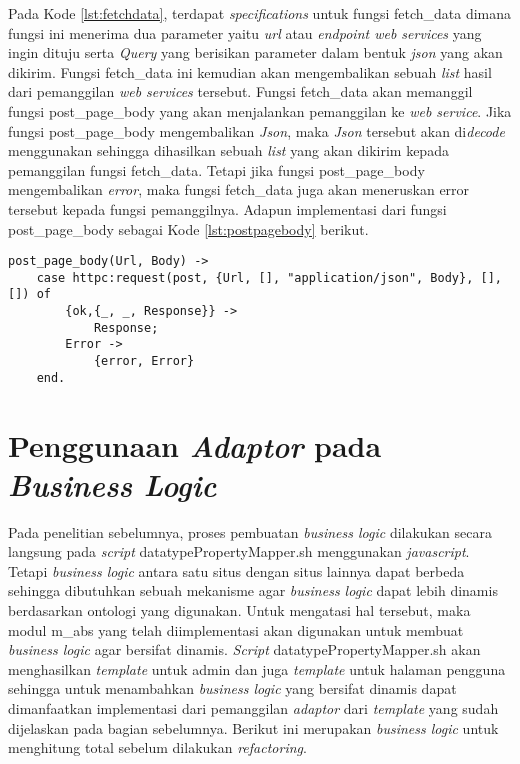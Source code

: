 Pada Kode \ref{lst:fetchdata}, terdapat \textit{specifications} untuk fungsi fetch\_data dimana fungsi ini menerima dua parameter yaitu \textit{url} atau \textit{endpoint web services} yang ingin dituju serta \textit{Query} yang berisikan parameter dalam bentuk \textit{json} yang akan dikirim. Fungsi fetch\_data ini kemudian akan mengembalikan sebuah \textit{list} hasil dari pemanggilan \textit{web services} tersebut. Fungsi fetch\_data akan memanggil fungsi post\_page\_body yang akan menjalankan pemanggilan ke \textit{web service}. Jika fungsi post\_page\_body mengembalikan \textit{Json}, maka \textit{Json} tersebut akan di\textit{decode} menggunakan  sehingga dihasilkan sebuah \textit{list} yang akan dikirim kepada pemanggilan fungsi fetch\_data. Tetapi jika fungsi post\_page\_body mengembalikan \textit{error}, maka fungsi fetch\_data juga akan meneruskan error tersebut kepada fungsi pemanggilnya. Adapun implementasi dari fungsi post\_page\_body sebagai Kode \ref{lst:postpagebody} berikut.

\begin{minipage}{\linewidth}
\begin{lstlisting}[caption={Implementasi fungsi post\_page\_body},label={lst:postpagebody}]
post_page_body(Url, Body) ->
	case httpc:request(post, {Url, [], "application/json", Body}, [], []) of
		{ok,{_, _, Response}} ->
			Response;
		Error ->
			{error, Error}
	end.
\end{lstlisting}
\end{minipage}
\section{Penggunaan \textit{Adaptor} pada \textit{Business Logic}}

Pada penelitian sebelumnya, proses pembuatan \textit{business logic} dilakukan secara langsung pada \textit{script} datatypePropertyMapper.sh menggunakan \textit{javascript}. Tetapi \textit{business logic} antara satu situs dengan situs lainnya dapat berbeda sehingga dibutuhkan sebuah mekanisme agar \textit{business logic} dapat lebih dinamis berdasarkan ontologi yang digunakan. Untuk mengatasi hal tersebut, maka modul m\_abs yang telah diimplementasi akan digunakan untuk membuat \textit{business logic} agar bersifat dinamis. \textit{Script} datatypePropertyMapper.sh akan menghasilkan \textit{template} untuk admin dan juga \textit{template} untuk halaman pengguna sehingga untuk menambahkan \textit{business logic} yang bersifat dinamis dapat dimanfaatkan implementasi dari pemanggilan \textit{adaptor} dari \textit{template} yang sudah dijelaskan pada bagian sebelumnya. Berikut ini merupakan \textit{business logic} untuk menghitung total sebelum dilakukan \textit{refactoring}.
	

